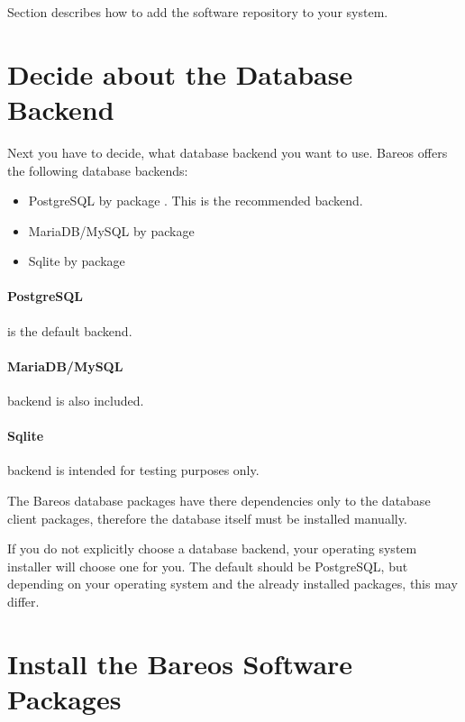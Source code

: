 Section  describes how to add the software repository to your system.


\section{Decide about the Database Backend}
    \label{sec:ChooseDatabaseBackend}

Next you have to decide, what database backend you want to use.
Bareos offers the following database backends:
\begin{itemize}
    \item PostgreSQL by package . This is the recommended backend.
    \item MariaDB/MySQL by package 
    \item Sqlite by package  \\
\end{itemize}

\paragraph{PostgreSQL} is the default backend.

\paragraph{MariaDB/MySQL} backend is also included.

\paragraph{Sqlite} backend is intended for testing purposes only.

The Bareos database packages have there dependencies only to the database client packages,
therefore the database itself must be installed manually.

If you do not explicitly choose a database backend, your operating system installer will choose one for you.
The default should be PostgreSQL, but depending on your operating system and the already installed packages,
this may differ.



\section{Install the Bareos Software Packages}
    \label{sec:InstallBareosPackages}

